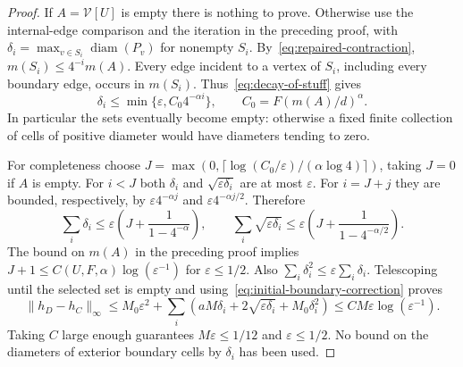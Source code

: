 \documentclass[12pt]{amsart}
\numberwithin{equation}{section}
\DeclareMathOperator{\diam}{{\mathop{diam}}}
\newcommand{\V}{\mathcal{V}}
\newcommand{\eps}{\varepsilon}
\begin{document}
\begin{proof}
If $A=\V[U]$ is empty there is nothing to prove. Otherwise use the internal-edge comparison and the iteration in the preceding proof, with
$\delta_i=\max_{v\in S_i}\diam(P_v)$ for nonempty $S_i$. By~\eqref{eq:repaired-contraction}, $m(S_i)\leq4^{-i}m(A)$. Every edge incident to a vertex of $S_i$, including every boundary edge, occurs in $m(S_i)$. Thus~\eqref{eq:decay-of-stuff} gives
\[
 \delta_i\leq\min\{\eps,C_0 4^{-\alpha i}\},
 \qquad C_0=F(m(A)/d)^\alpha.
\]
In particular the sets eventually become empty: otherwise a fixed finite collection of cells of positive diameter would have diameters tending to zero.

For completeness choose $J=\max(0,\lceil\log(C_0/\eps)/(\alpha\log4)\rceil)$, taking $J=0$ if $A$ is empty. For $i<J$ both $\delta_i$ and $\sqrt{\eps\delta_i}$ are at most $\eps$. For $i=J+j$ they are bounded, respectively, by $\eps4^{-\alpha j}$ and $\eps4^{-\alpha j/2}$. Therefore
\[
 \sum_i\delta_i\leq\eps\left(J+\frac1{1-4^{-\alpha}}\right),\qquad
 \sum_i\sqrt{\eps\delta_i}\leq\eps\left(J+\frac1{1-4^{-\alpha/2}}\right).
\]
The bound on $m(A)$ in the preceding proof implies $J+1\leq C(U,F,\alpha)\log(\eps^{-1})$ for $\eps\leq1/2$. Also $\sum_i\delta_i^2\leq\eps\sum_i\delta_i$.
Telescoping until the selected set is empty and using~\eqref{eq:initial-boundary-correction} proves
\[
 \|h_D-h_C\|_\infty
 \leq M_0\eps^2+\sum_i(aM\delta_i+2\sqrt{\eps\delta_i}+M_0\delta_i^2)
 \leq CM\eps\log(\eps^{-1}).
\]
Taking $C$ large enough guarantees $M\eps\leq1/12$ and $\eps\leq1/2$. No bound on the diameters of exterior boundary cells by $\delta_i$ has been used.
\end{proof}
\end{document}
